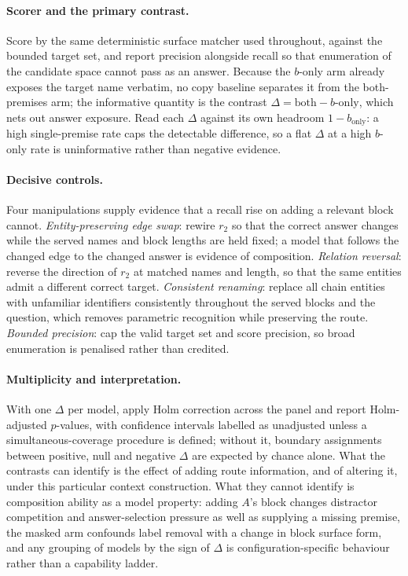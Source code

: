 \documentclass[10pt,twocolumn]{article}
\begin{document}
\paragraph{Scorer and the primary contrast.} Score by the same deterministic surface matcher used
throughout, against the bounded target set, and report precision alongside recall so that
enumeration of the candidate space cannot pass as an answer. Because the $b$-only arm already
exposes the target name verbatim, no copy baseline separates it from the both-premises arm; the
informative quantity is the contrast $\Delta=\textrm{both}-b\textrm{-only}$, which nets out answer
exposure. Read each $\Delta$ against its own headroom $1-b_{\textrm{only}}$: a high single-premise
rate caps the detectable difference, so a flat $\Delta$ at a high $b$-only rate is uninformative
rather than negative evidence.

\paragraph{Decisive controls.} Four manipulations supply evidence that a recall rise on adding a relevant
block cannot. \emph{Entity-preserving edge swap}: rewire $r_2$ so that the correct answer
changes while the served names and block lengths are held fixed; a model that follows the changed
edge to the changed answer is evidence of composition. \emph{Relation reversal}: reverse the
direction of $r_2$ at matched names and length, so that the same entities admit a different correct
target. \emph{Consistent renaming}: replace all chain entities with unfamiliar identifiers
consistently throughout the served blocks and the question, which removes parametric recognition
while preserving the route. \emph{Bounded precision}: cap the valid target set and score precision,
so broad enumeration is penalised rather than credited.

\paragraph{Multiplicity and interpretation.} With one $\Delta$ per model, apply Holm correction
across the panel and report Holm-adjusted $p$-values, with confidence intervals labelled as unadjusted unless a simultaneous-coverage procedure is defined; without it, boundary assignments between
positive, null and negative $\Delta$ are expected by chance alone. What the contrasts can identify
is the effect of adding route information, and of altering it, under this particular context
construction. What they cannot identify is composition ability as a model property: adding $A$'s
block changes distractor competition and answer-selection pressure as well as supplying a missing
premise, the masked arm confounds label removal with a change in block surface form, and any grouping
of models by the sign of $\Delta$ is configuration-specific behaviour rather than a capability
ladder.


\twocolumn
\printbibliography
\end{document}
